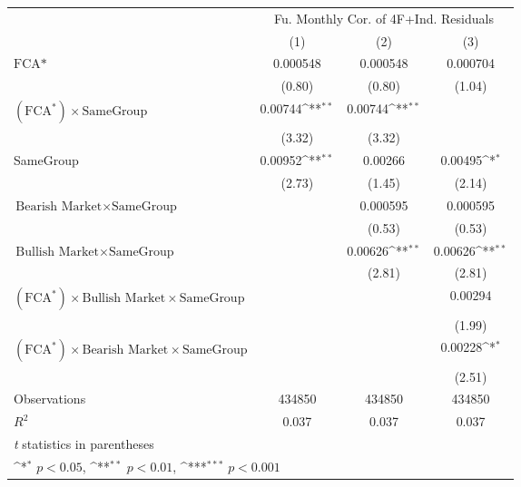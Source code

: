 {
\def\sym#1{\ifmmode^{#1}\else\(^{#1}\)\fi}
\begin{tabular}{l*{3}{c}}
\hline\hline
                &\multicolumn{3}{c}{Fu. Monthly Cor. of 4F+Ind. Residuals}\\\cmidrule(lr){2-4}
                &\multicolumn{1}{c}{(1)}         &\multicolumn{1}{c}{(2)}         &\multicolumn{1}{c}{(3)}         \\
\hline
$ \text{FCA*} $ & 0.000548         & 0.000548         & 0.000704         \\
                &   (0.80)         &   (0.80)         &   (1.04)         \\
[1em]
 $ (\text{FCA}^*) \times {\text{SameGroup} }  $ &  0.00744\sym{**} &  0.00744\sym{**} &                  \\
                &   (3.32)         &   (3.32)         &                  \\
[1em]
SameGroup       &  0.00952\sym{**} &  0.00266         &  0.00495\sym{*}  \\
                &   (2.73)         &   (1.45)         &   (2.14)         \\
[1em]
$ {\text{Bearish Market} } \times {\text{SameGroup} }  $ &                  & 0.000595         & 0.000595         \\
                &                  &   (0.53)         &   (0.53)         \\
[1em]
$ {\text{Bullish Market} } \times {\text{SameGroup} }  $ &                  &  0.00626\sym{**} &  0.00626\sym{**} \\
                &                  &   (2.81)         &   (2.81)         \\
[1em]
$ (\text{FCA}^*) \times {\text{Bullish Market}} \times {\text{SameGroup} }  $ &                  &                  &  0.00294         \\
                &                  &                  &   (1.99)         \\
[1em]
$ (\text{FCA}^*) \times {\text{Bearish Market}} \times {\text{SameGroup} }  $ &                  &                  &  0.00228\sym{*}  \\
                &                  &                  &   (2.51)         \\
\hline
Observations    &   434850         &   434850         &   434850         \\
\(R^{2}\)       &    0.037         &    0.037         &    0.037         \\
\hline\hline
\multicolumn{4}{l}{\footnotesize \textit{t} statistics in parentheses}\\
\multicolumn{4}{l}{\footnotesize \sym{*} \(p<0.05\), \sym{**} \(p<0.01\), \sym{***} \(p<0.001\)}\\
\end{tabular}
}
